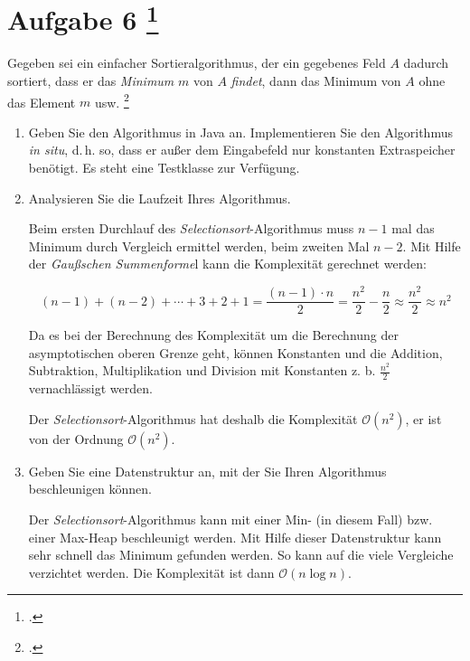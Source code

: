 \documentclass{lehramt-informatik-minimal}
\begin{document}
\section{Aufgabe 6
\footcite[Aufgabe 4, Seite 4]{aud:ab:3}}

Gegeben sei ein einfacher Sortieralgorithmus, der ein gegebenes Feld $A$
dadurch sortiert, dass er das \emph{Minimum} $m$ von $A$ \emph{findet},
dann das Minimum von $A$ ohne das Element $m$ usw.
\footcite[Thema 2 Aufgabe 6 Seite 5]{examen:66115:2014:09}

\begin{enumerate}


\item Geben Sie den Algorithmus in Java an.
Implementieren Sie den Algorithmus
\emph{in situ}, d.\,h. so, dass er außer dem Eingabefeld nur konstanten
Extraspeicher benötigt. Es steht eine Testklasse zur Verfügung.

\begin{antwort}
\end{antwort}


\item Analysieren Sie die Laufzeit Ihres Algorithmus.

\begin{antwort}
Beim ersten Durchlauf des \emph{Selectionsort}-Algorithmus muss $n - 1$
mal das Minimum durch Vergleich ermittel werden, beim zweiten Mal
$n - 2$.
Mit Hilfe der \emph{Gaußschen Summenforme}l kann die Komplexität
gerechnet werden:

\begin{displaymath}
(n-1)+(n-2)+\dotsb+3+2+1 =
\frac{(n-1)\cdot n}{2} =
\frac{n^2}{2}-\frac{n}{2} \approx
\frac{n^2}{2} \approx
n^2
\end{displaymath}

Da es bei der Berechnung des Komplexität um die Berechnung der
asymptotischen oberen Grenze geht, können Konstanten und die Addition,
Subtraktion, Multiplikation und Division mit Konstanten z. b.
$\frac{n^2}{2}$ vernachlässigt werden.

Der \emph{Selectionsort}-Algorithmus hat deshalb die Komplexität
$\mathcal{O}(n^2)$, er ist von der Ordnung
$\mathcal{O}(n^2)$.
\end{antwort}


\item Geben Sie eine Datenstruktur an, mit der Sie Ihren Algorithmus
beschleunigen können.

\begin{antwort}
Der \emph{Selectionsort}-Algorithmus kann mit einer Min- (in diesem
Fall) bzw. einer Max-Heap beschleunigt werden. Mit Hilfe dieser
Datenstruktur kann sehr schnell das Minimum gefunden werden. So kann auf
die viele Vergleiche verzichtet werden. Die Komplexität ist dann
$\mathcal{O}(n \log n)$.
\end{antwort}
\end{enumerate}
\end{document}
